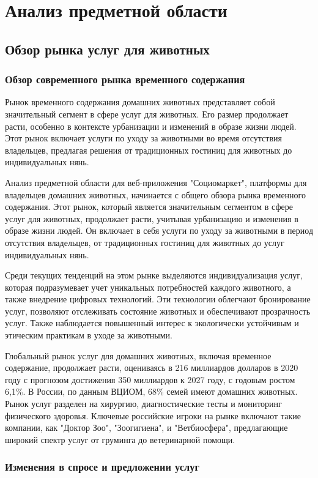 \section{Анализ предметной области}
\subsection{Обзор рынка услуг для животных}
\subsubsection{Обзор современного рынка временного содержания}

Рынок временного содержания домашних животных представляет собой значительный сегмент в сфере услуг для животных. Его размер продолжает расти, особенно в контексте урбанизации и изменений в образе жизни людей. Этот рынок включает услуги по уходу за животными во время отсутствия владельцев, предлагая решения от традиционных гостиниц для животных до индивидуальных нянь.

Анализ предметной области для веб-приложения "Социомаркет", платформы для владельцев домашних животных, начинается с общего обзора рынка временного содержания. Этот рынок, который является значительным сегментом в сфере услуг для животных, продолжает расти, учитывая урбанизацию и изменения в образе жизни людей. Он включает в себя услуги по уходу за животными в период отсутствия владельцев, от традиционных гостиниц для животных до услуг индивидуальных нянь.

Среди текущих тенденций на этом рынке выделяются индивидуализация услуг, которая подразумевает учет уникальных потребностей каждого животного, а также внедрение цифровых технологий. Эти технологии облегчают бронирование услуг, позволяют отслеживать состояние животных и обеспечивают прозрачность услуг. Также наблюдается повышенный интерес к экологически устойчивым и этическим практикам в уходе за животными.

Глобальный рынок услуг для домашних животных, включая временное содержание, продолжает расти, оцениваясь в 216 миллиардов долларов в 2020 году с прогнозом достижения 350 миллиардов к 2027 году, с годовым ростом 6,1\%​​. В России, по данным ВЦИОМ, 68\% семей имеют домашних животных. Рынок услуг разделен на хирургию, диагностические тесты и мониторинг физического здоровья​​. Ключевые российские игроки на рынке включают такие компании, как "Доктор Зоо", "Зоогигиена", и "Ветбиосфера", предлагающие широкий спектр услуг от груминга до ветеринарной помощи.
\subsubsection{Изменения в спросе и предложении услуг}


